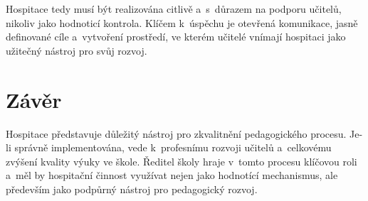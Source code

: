Hospitace tedy musí být realizována citlivě a~s~důrazem na podporu učitelů, nikoliv jako hodnoticí kontrola. Klíčem k~úspěchu je otevřená komunikace, jasně definované cíle a~vytvoření prostředí, ve kterém učitelé vnímají hospitaci jako užitečný nástroj pro svůj rozvoj.

\newpage
\section*{Závěr} 

Hospitace představuje důležitý nástroj pro zkvalitnění pedagogického procesu. Je-li správně implementována, vede k~profesnímu rozvoji učitelů a~celkovému zvýšení kvality výuky ve škole. Ředitel školy hraje v~tomto procesu klíčovou roli a~měl by hospitační činnost využívat nejen jako hodnotící mechanismus, ale především jako podpůrný nástroj pro pedagogický rozvoj.